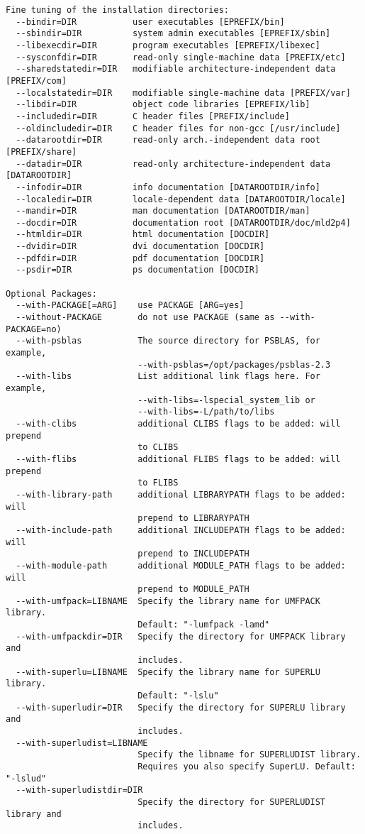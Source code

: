 \begin{verbatim}
Fine tuning of the installation directories:
  --bindir=DIR           user executables [EPREFIX/bin]
  --sbindir=DIR          system admin executables [EPREFIX/sbin]
  --libexecdir=DIR       program executables [EPREFIX/libexec]
  --sysconfdir=DIR       read-only single-machine data [PREFIX/etc]
  --sharedstatedir=DIR   modifiable architecture-independent data [PREFIX/com]
  --localstatedir=DIR    modifiable single-machine data [PREFIX/var]
  --libdir=DIR           object code libraries [EPREFIX/lib]
  --includedir=DIR       C header files [PREFIX/include]
  --oldincludedir=DIR    C header files for non-gcc [/usr/include]
  --datarootdir=DIR      read-only arch.-independent data root [PREFIX/share]
  --datadir=DIR          read-only architecture-independent data [DATAROOTDIR]
  --infodir=DIR          info documentation [DATAROOTDIR/info]
  --localedir=DIR        locale-dependent data [DATAROOTDIR/locale]
  --mandir=DIR           man documentation [DATAROOTDIR/man]
  --docdir=DIR           documentation root [DATAROOTDIR/doc/mld2p4]
  --htmldir=DIR          html documentation [DOCDIR]
  --dvidir=DIR           dvi documentation [DOCDIR]
  --pdfdir=DIR           pdf documentation [DOCDIR]
  --psdir=DIR            ps documentation [DOCDIR]

Optional Packages:
  --with-PACKAGE[=ARG]    use PACKAGE [ARG=yes]
  --without-PACKAGE       do not use PACKAGE (same as --with-PACKAGE=no)
  --with-psblas           The source directory for PSBLAS, for example,
                          --with-psblas=/opt/packages/psblas-2.3
  --with-libs             List additional link flags here. For example,
                          --with-libs=-lspecial_system_lib or
                          --with-libs=-L/path/to/libs
  --with-clibs            additional CLIBS flags to be added: will prepend
                          to CLIBS
  --with-flibs            additional FLIBS flags to be added: will prepend
                          to FLIBS
  --with-library-path     additional LIBRARYPATH flags to be added: will
                          prepend to LIBRARYPATH
  --with-include-path     additional INCLUDEPATH flags to be added: will
                          prepend to INCLUDEPATH
  --with-module-path      additional MODULE_PATH flags to be added: will
                          prepend to MODULE_PATH
  --with-umfpack=LIBNAME  Specify the library name for UMFPACK library.
                          Default: "-lumfpack -lamd"
  --with-umfpackdir=DIR   Specify the directory for UMFPACK library and
                          includes.
  --with-superlu=LIBNAME  Specify the library name for SUPERLU library.
                          Default: "-lslu"
  --with-superludir=DIR   Specify the directory for SUPERLU library and
                          includes.
  --with-superludist=LIBNAME
                          Specify the libname for SUPERLUDIST library.
                          Requires you also specify SuperLU. Default: "-lslud"
  --with-superludistdir=DIR
                          Specify the directory for SUPERLUDIST library and
                          includes.


\end{verbatim}
